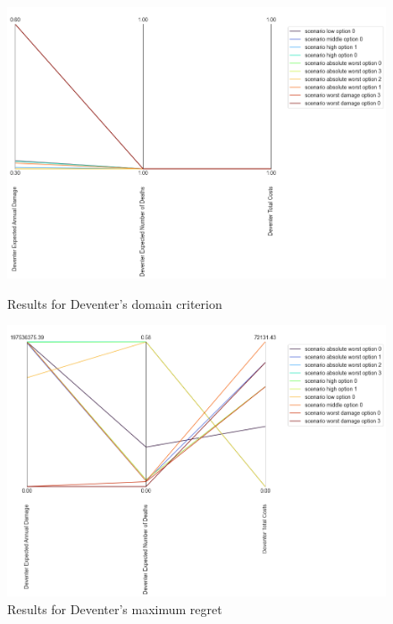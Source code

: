 \begin{figure}[H]
  \centering
  \begin{minipage}[b]{0.4\textwidth}
    \includegraphics[width=1.15\textwidth]{report/figures/results/domain_criterion_Deventer.png}
    \caption{Results for Deventer's domain criterion}
    \label{fig:domain_criterion_Deventers}
  \end{minipage}
  \hfill
  \begin{minipage}[b]{0.4\textwidth}
    \includegraphics[width=1.15\textwidth]{report/figures/results/regret_figure_Deventer.png}
    \caption{Results for Deventer's maximum regret}
    \label{fig:regret_Deventers}
  \end{minipage}
\end{figure}

